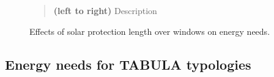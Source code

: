 \documentclass[11pt]{article}
\begin{document}
\begin{figure}[ht]
            \caption{\label{fig:shading_init} Effects of solar protection length over windows on energy needs.}
            \begin{quote}
                \vspace{-2mm}
                \small\noindent
                \textbf{(left to right)} Description
            \end{quote}
        \end{figure}
        

    \subsection{Energy needs for TABULA typologies} %
    \label{sub:energy_needs_for_tabula_typologies}


        


\end{document}
